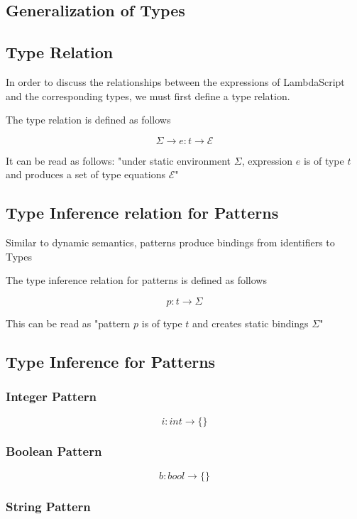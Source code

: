 \documentclass[titlepage]{article}
\begin{document}
\subsection{Generalization of Types}



\subsection{Type Relation}

In order to discuss the relationships between the expressions of LambdaScript and the corresponding types, we must first define a type relation.

The type relation is defined as follows

$$\Sigma \rightarrow e : t \rightarrow \mathcal{E}$$

It can be read as follows: "under static environment $\Sigma$, expression $e$ is of type $t$ and produces a set of type equations $\mathcal{E}$"

\subsection{Type Inference relation for Patterns}

Similar to dynamic semantics, patterns produce bindings from identifiers to Types

The type inference relation for patterns is defined as follows

$$p : t \rightarrow \Sigma$$

This can be read as "pattern $p$ is of type $t$ and creates static bindings $\Sigma$"

\subsection{Type Inference for Patterns}

\subsubsection{Integer Pattern}

$$i : int \rightarrow \{\}$$

\subsubsection{Boolean Pattern}

$$b : bool \rightarrow \{\}$$

\subsubsection{String Pattern}
\end{document}
